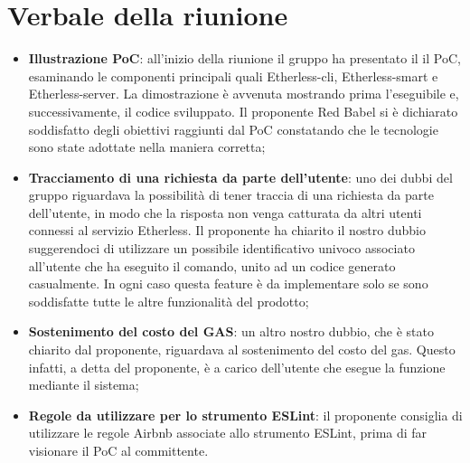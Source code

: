 \section{Verbale della riunione}
	\begin{itemize}
		\item \textbf{Illustrazione PoC}: all'inizio della riunione il gruppo ha presentato il il PoC, esaminando le componenti principali quali Etherless-cli, Etherless-smart e Etherless-server. La dimostrazione è avvenuta mostrando prima l'eseguibile e, successivamente, il codice sviluppato. Il proponente Red Babel si è dichiarato soddisfatto degli obiettivi raggiunti dal PoC constatando che le tecnologie sono state adottate nella maniera corretta;
		\item \textbf{Tracciamento di una richiesta da parte dell'utente}: uno dei dubbi del gruppo riguardava la  possibilità di tener traccia di una richiesta da parte dell'utente, in modo che la risposta non venga catturata da altri utenti connessi al servizio Etherless. Il proponente ha chiarito il nostro dubbio suggerendoci di utilizzare un possibile identificativo univoco associato all'utente che ha eseguito il comando, unito ad  un codice generato casualmente. In ogni caso questa feature è da implementare solo se sono soddisfatte tutte le altre funzionalità del prodotto;
		\item \textbf{Sostenimento del costo del GAS}: un altro nostro dubbio, che è stato chiarito dal proponente, riguardava al sostenimento del costo del gas. Questo infatti, a detta del proponente, è a carico dell'utente che esegue la funzione mediante il sistema;
		\item \textbf{Regole da utilizzare per lo strumento ESLint}: il proponente consiglia di utilizzare le regole Airbnb associate allo strumento ESLint, prima di far visionare il PoC al committente.
	\end{itemize}
